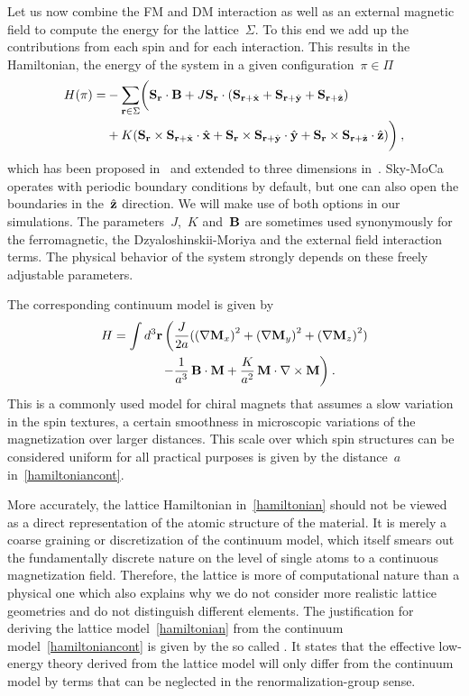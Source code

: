 Let us now combine the FM and DM interaction as well as an external magnetic
field to compute the energy for the lattice~$\Sigma$. To this end we add up the
contributions from each spin and for each interaction. This results in the
Hamiltonian, \ie{} the energy of the system in a given configuration~$\pi \in
\Pi$
%
\begin{align}\label{hamiltonian}
  H(\pi) = &-\sum_{\mathbf{r} \in \Sigma}\biggl(\mathbf{S}_{\mathbf{r}} \cdot \mathbf{B} +
      J \mathbf{S}_{\mathbf{r}} \cdot (\mathbf{S}_{\mathbf{r}+\hat{\mathbf{x}}} + \mathbf{S}_{\mathbf{r}+\hat{\mathbf{y}}} + \mathbf{S}_{\mathbf{r}+\hat{\mathbf{z}}})\nonumber \\
      &+ K (\mathbf{S}_{\mathbf{r}} \times \mathbf{S}_{\mathbf{r}+\hat{\mathbf{x}}} \cdot \hat{\mathbf{x}} +
            \mathbf{S}_{\mathbf{r}} \times \mathbf{S}_{\mathbf{r}+\hat{\mathbf{y}}} \cdot \hat{\mathbf{y}} +
            \mathbf{S}_{\mathbf{r}} \times \mathbf{S}_{\mathbf{r}+\hat{\mathbf{z}}} \cdot \hat{\mathbf{z}})\biggr)\:,
\end{align}
%
which has been proposed in~\cite{skyrm13} and extended to three dimensions
in~\cite{skyrmion}. Sky-MoCa operates with periodic boundary conditions by
default, but one can also open the boundaries in the~$\hat{\mathbf{z}}$ direction. We will
make use of both options in our simulations. The parameters~$J$,~$K$ and~$\mathbf{B}$
are sometimes used synonymously for the ferromagnetic, the Dzyaloshinskii-Moriya
and the external field interaction terms. The physical behavior of the system
strongly depends on these freely adjustable parameters.

The corresponding continuum model is given by~\cite{skyrm4, skyrm12}
%
\begin{align}\label{hamiltoniancont}
  H = \int d^3 \mathbf{r}\, \biggl( & \frac{J}{2 a}
  ({(\nabla \mathbf{M}_x)}^2 + {(\nabla \mathbf{M}_y)}^2 + {(\nabla \mathbf{M}_z)}^2) \\
  - & \frac{1}{a^3}\, \mathbf{B} \cdot \mathbf{M} +
  \frac{K}{a^2}\, \mathbf{M} \cdot \nabla \times \mathbf{M} \biggr) \:.
\end{align}
%
This is a commonly used model for chiral magnets that assumes a slow variation
in the spin textures, \ie{} a certain smoothness in microscopic variations of
the magnetization over larger distances. This scale over which spin structures
can be considered uniform for all practical purposes is given by the
distance~$a$ in~\eqref{hamiltoniancont}.

More accurately, the lattice Hamiltonian in~\eqref{hamiltonian} should not be
viewed as a direct representation of the atomic structure of the material. It is
merely a coarse graining or discretization of the continuum model, which itself
smears out the fundamentally discrete nature on the level of single atoms to a
continuous magnetization field. Therefore, the lattice is more of computational
nature than a physical one which also explains why we do not consider more
realistic lattice geometries and do not distinguish different elements. The
justification for deriving the lattice model~\eqref{hamiltonian} from the
continuum model~\eqref{hamiltoniancont} is given by the so called
. It states that the effective low-energy theory
derived from the lattice model will only differ from the continuum model by
terms that can be neglected in the renormalization-group sense.

